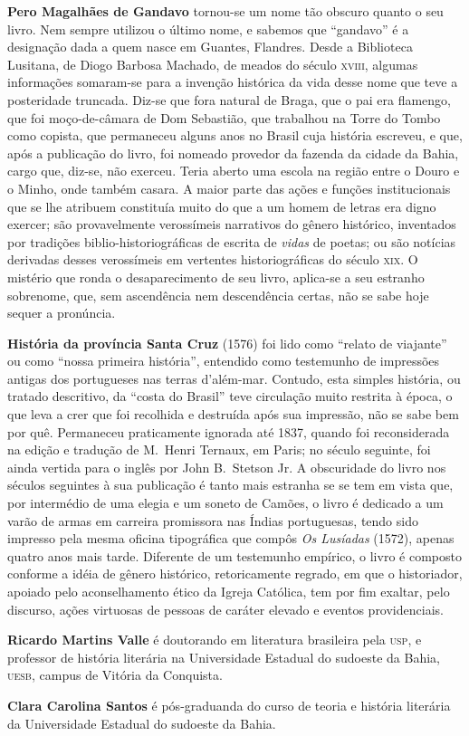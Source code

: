 
\textbf{Pero Magalhães de Gandavo} tornou{}-se um nome tão
obscuro quanto o seu livro. Nem sempre utilizou o último nome, e sabemos que
``gandavo'' é a designação dada a quem nasce em Guantes, Flandres.  Desde a
Biblioteca Lusitana, de Diogo Barbosa Machado, de meados do século
\textsc{xviii}, algumas informações somaram{}-se para a invenção histórica da
vida desse nome que teve a posteridade truncada. Diz{}-se que fora natural de
Braga, que o pai era flamengo, que foi moço{}-de{}-câmara de Dom Sebastião, que
trabalhou na Torre do Tombo como copista, que permaneceu alguns anos no Brasil
cuja história escreveu, e que, após a publicação do livro, foi nomeado provedor
da fazenda da cidade da Bahia, cargo que, diz{}-se, não exerceu. Teria aberto
uma escola na região entre o Douro e o Minho, onde também casara. A maior parte
das ações e funções institucionais que se lhe atribuem constituía muito do que a
um homem de letras era digno exercer; são provavelmente verossímeis narrativos
do gênero histórico, inventados por tradições biblio{}-historiográficas de
escrita de \textit{vidas} de poetas; ou são notícias derivadas desses
verossímeis em vertentes historiográficas do século \textsc{xix}. O mistério que
ronda o desaparecimento de seu livro, aplica{}-se a seu estranho sobrenome, que,
sem ascendência nem descendência certas, não se sabe hoje sequer a pronúncia.
       
\textbf{História da província Santa Cruz} (1576) foi lido como ``relato de
viajante'' ou como ``nossa primeira história'', entendido como testemunho de
impressões antigas dos portugueses nas terras d'além{}-mar. Contudo, esta
simples história, ou tratado descritivo, da ``costa do Brasil'' teve circulação
muito restrita à época, o que leva a crer que foi recolhida e destruída após sua
impressão, não se sabe bem por quê. Permaneceu praticamente ignorada até 1837,
quando foi reconsiderada na edição e tradução de M.~Henri Ternaux, em Paris; no
século seguinte, foi ainda vertida para o inglês por John B.~Stetson Jr. A
obscuridade do livro nos séculos seguintes à sua publicação é tanto mais
estranha se se tem em vista que, por intermédio de uma elegia e um soneto de
Camões, o livro é dedicado a um varão de armas em carreira promissora nas Índias
portuguesas, tendo sido impresso pela mesma oficina tipográfica que compôs
\textit{Os Lusíadas} (1572), apenas quatro anos mais tarde. Diferente de um
testemunho empírico, o livro é composto conforme a idéia de gênero histórico,
retoricamente regrado, em que o historiador, apoiado pelo aconselhamento ético
da Igreja Católica, tem por fim exaltar, pelo discurso, ações virtuosas de
pessoas de caráter elevado e eventos providenciais. 

\textbf{Ricardo Martins Valle} é doutorando em literatura brasileira pela
\textsc{usp}, e professor de história literária na Universidade Estadual do
sudoeste da Bahia, \textsc{uesb}, campus de Vitória da Conquista.

\textbf{Clara Carolina Santos} é pós{}-graduanda do curso de teoria e história
literária da Universidade Estadual do sudoeste da Bahia.  


